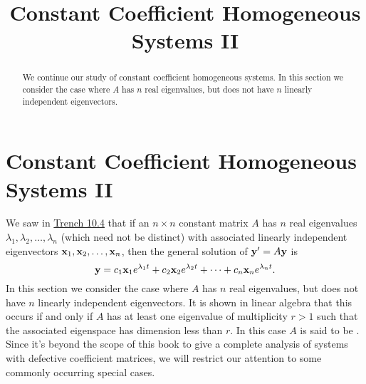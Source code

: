 \documentclass{ximera}
\title{Constant Coefficient Homogeneous Systems II}%
\begin{document}
\begin{abstract}
We continue our study of constant coefficient homogeneous systems.  In this section we consider the case where $A$ has $n$ real
eigenvalues, but does not have $n$ linearly independent eigenvectors.
\end{abstract}

\maketitle

\section*{Constant Coefficient Homogeneous Systems II}

We saw in \href{https://ximera.osu.edu/ode/main/constCoeffHomSysI/constCoeffHomSysI}{Trench 10.4} that if an $n\times n$
constant matrix
$A$ has $n$ real eigenvalues $\lambda_1, \lambda_2, \dots, \lambda_n$
(which need not be distinct) with associated linearly independent
eigenvectors ${\bf x}_1, {\bf x}_2, \dots, {\bf x}_n$, then the general
solution of ${\bf y}'=A{\bf y}$ is
$$
{\bf y}=c_1{\bf x}_1e^{\lambda_1t}+c_2{\bf x}_2e^{\lambda_2 t}
+\cdots+c_n{\bf x}_ne^{\lambda_n t}.
$$
In this section we consider the case where $A$ has $n$ real
eigenvalues, but does not have $n$ linearly independent eigenvectors.
It is shown in linear algebra that this occurs if and only if $A$ has
at least one eigenvalue of multiplicity $r>1$ such that the associated
eigenspace has dimension less than $r$. In this case $A$ is said to be
. Since it's beyond the scope of this book to give a
complete analysis of systems with defective coefficient matrices, we
will restrict our attention to some commonly occurring special cases.
\end{document}
